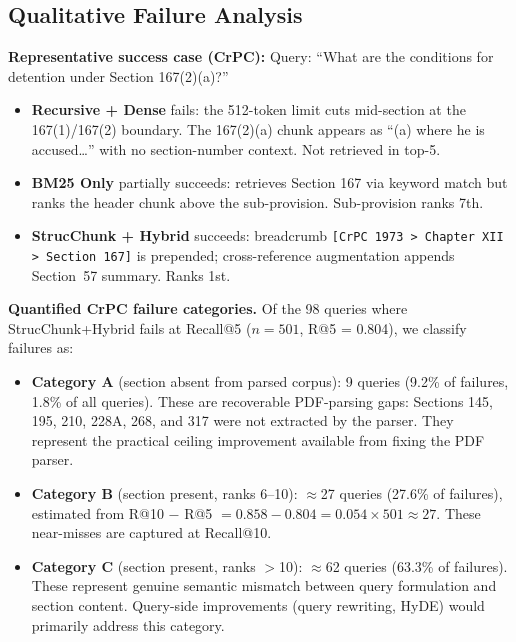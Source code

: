 \documentclass[sn-mathphys,Numbered]{sn-jnl}%
\begin{document}
\subsection{Qualitative Failure Analysis}

\textbf{Representative success case (CrPC):}  Query: ``What are the
conditions for detention under Section 167(2)(a)?''

\begin{itemize}
\item \textbf{Recursive + Dense} fails: the 512-token limit cuts
      mid-section at the 167(1)/167(2) boundary.  The 167(2)(a) chunk
      appears as ``(a) where he is accused\ldots'' with no section-number
      context.  Not retrieved in top-5.
\item \textbf{BM25 Only} partially succeeds: retrieves Section 167 via
      keyword match but ranks the header chunk above the sub-provision.
      Sub-provision ranks 7th.
\item \textbf{StrucChunk + Hybrid} succeeds: breadcrumb
      \texttt{[CrPC~1973 > Chapter~XII > Section~167]} is prepended;
      cross-reference augmentation appends Section~57 summary.  Ranks 1st.
\end{itemize}

\textbf{Quantified CrPC failure categories.}  Of the 98 queries where
StrucChunk+Hybrid fails at Recall@5 ($n = 501$, R@5 = 0.804), we classify
failures as:

\begin{itemize}
\item \textbf{Category A} (section absent from parsed corpus): 9 queries
      (9.2\% of failures, 1.8\% of all queries).  These are recoverable
      PDF-parsing gaps: Sections 145, 195, 210, 228A, 268, and 317 were
      not extracted by the parser.  They represent the practical ceiling
      improvement available from fixing the PDF parser.
\item \textbf{Category B} (section present, ranks 6--10): $\approx$27
      queries (27.6\% of failures), estimated from R@10 $-$ R@5 $= 0.858
      - 0.804 = 0.054 \times 501 \approx 27$.  These near-misses are
      captured at Recall@10.
\item \textbf{Category C} (section present, ranks $>$10): $\approx$62
      queries (63.3\% of failures).  These represent genuine semantic
      mismatch between query formulation and section content.  Query-side
      improvements (query rewriting, HyDE) would primarily address this
      category.
\end{itemize}
\end{document}
